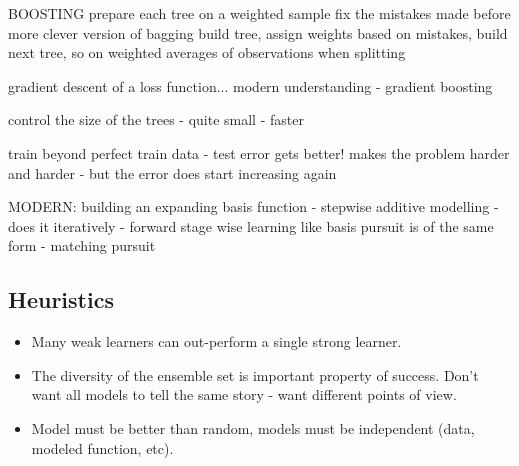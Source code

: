 \begin{bibunit}
BOOSTING
prepare each tree on a weighted sample
fix the mistakes made before
more clever version of bagging
build tree, assign weights based on mistakes, build next tree, so on
weighted averages of observations when splitting

gradient descent of a loss function... modern understanding - gradient boosting

control the size of the trees - quite small - faster

train beyond perfect train data - test error gets better!
makes the problem harder and harder - but the error does start increasing again

MODERN:
building an expanding basis function - stepwise additive modelling - does it iteratively - forward stage wise learning
like basis pursuit is of the same form - matching pursuit




\subsection{Heuristics}


\begin{itemize}
	\item Many weak learners can out-perform a single strong learner.
	\item The diversity of the ensemble set is important property of success. Don't want all models to tell the same story - want different points of view.
	\item Model must be better than random, models must be independent (data, modeled function, etc).
\end{itemize}



\end{bibunit}
